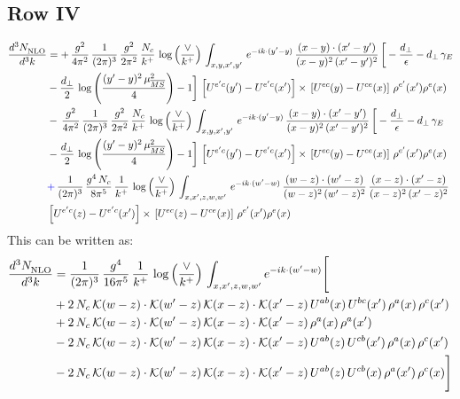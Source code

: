 \documentclass[9pt]{article}
\numberwithin{equation}{section}
\begin{document}
\subsection{Row IV}
\begin{align}
    \frac{d^{3}N_{\rm NLO}^{\rm}}{d^{3}k}  & =    +\, \frac{g^{2}}{4\pi^{2}}\, \frac{1}{(2\pi)^{3}}\,\frac{g^{2}}{2\pi^{2}}\, \frac{N_{c}}{k^{+}}\,\log{\left(\frac{\vee}{k^{+}}\right)}\,\int_{x,y,x',y'}\,e^{-ik\cdot (y'-y)}\,\frac{(x-y)\cdot (x'-y')}{(x-y)^{2}\,(x'-y')^{2}}\,\bigg[-\frac{d_{\perp}}{\epsilon}-d_{\perp}\,\gamma_{E}\notag \\ & -\frac{d_{\perp}}{2}\,\log{\left(\frac{(y'-y)^{2}\,\mu^{2}_{\overline{MS}}}{4}\right)}-1\bigg]\,\left[U^{e'c}(y') - U^{e'c}(x')\right] \times\, \left[U^{ec}(y) - U^{ce}(x)\right]\, \rho^{e'}(x') \rho^{e}(x) \notag \\
&   -\, \frac{g^{2}}{4\pi^{2}}\, \frac{1}{(2\pi)^{3}}\,\frac{g^{2}}{2\pi^{2}}\, \frac{N_{c}}{k^{+}}\,\log{\left(\frac{\vee}{k^{+}}\right)}\,\int_{x,y,x',y'}\,e^{-ik\cdot (y'-y)}\,\frac{(x-y)\cdot (x'-y')}{(x-y)^{2}\,(x'-y')^{2}}\,\bigg[-\frac{d_{\perp}}{\epsilon}-d_{\perp}\,\gamma_{E}\notag \\ &   -\frac{d_{\perp}}{2}\,\log{\left(\frac{(y'-y)^{2}\,\mu^{2}_{\overline{MS}}}{4}\right)}-1\bigg]\,\left[U^{e'c}(y') - U^{e'c}(x')\right] \times\, \left[U^{ec}(y) - U^{ce}(x)\right]\, \rho^{e'}(x') \rho^{e}(x) \notag \\
&   {\color{blue}+}\,\frac{1}{(2\pi)^{3}}\,\frac{g^{4}\,N_{c}}{8\pi^{5}}\,\frac{1}{k^{+}}\,\log{\left(\frac{\vee}{k^{+}}\right)}\,\int_{x,x',z,w,w'}\,e^{-ik\cdot (w'-w)}\,\frac{(w-z)\cdot(w'-z)}{(w-z)^{2}\,(w'-z)^{2}}\,\frac{(x-z)\cdot(x'-z)}{(x-z)^{2}\,(x'-z)^{2}}\notag \\ &   \left[U^{e'c}(z) - U^{e'c}(x')\right] \times\, \left[U^{ec}(z) - U^{ce}(x)\right]\, \rho^{e'}(x') \rho^{e}(x)
\end{align}
This can be written as: 
\begin{align}
    \frac{d^{3}N_{\rm NLO}^{\rm}}{d^{3}k}  & = \frac{1}{(2\pi)^{3}}\,\frac{g^{4}}{16\pi^{5}}\,\frac{1}{k^{+}}\,\log{\left(\frac{\vee}{k^{+}}\right)}\, \int_{x,x',z,w,w'}e^{-ik\cdot(w'-w)}\Bigg[\notag\\ & +2\,N_{c}\,\mathcal{K}(w-z)\cdot\mathcal{K}(w'-z)\,\mathcal{K}(x-z)\cdot\mathcal{K}(x'-z)\,U^{ab}(x)\,U^{bc}(x')\,\rho^{a}(x)\,\rho^{c}(x')\notag \\ 
&+2\,N_{c}\,\mathcal{K}(w-z)\cdot\mathcal{K}(w'-z)\,\mathcal{K}(x-z)\cdot\mathcal{K}(x'-z)\,\rho^{a}(x)\,\rho^{a}(x')\notag \\ 
&-2\,N_{c}\,\mathcal{K}(w-z)\cdot\mathcal{K}(w'-z)\,\mathcal{K}(x-z)\cdot\mathcal{K}(x'-z)\,U^{ab}(z)\,U^{cb}(x')\,\rho^{a}(x)\,\rho^{c}(x')\notag \\ 
&-2\,N_{c}\,\mathcal{K}(w-z)\cdot\mathcal{K}(w'-z)\,\mathcal{K}(x-z)\cdot\mathcal{K}(x'-z)\,U^{ab}(z)\,U^{cb}(x)\,\rho^{a}(x')\,\rho^{c}(x)\Bigg]
\end{align}
\end{document}
